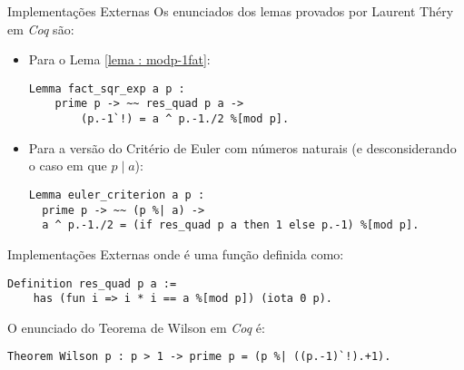 \begin{frame}[fragile]{Implementações Externas}
    Os enunciados dos lemas provados por Laurent Théry em \textit{Coq} são:
    \begin{itemize}
        \item Para o Lema \ref{lema : modp-1fat}:
            \begin{lstlisting}[language=coq,frame=single,tabsize=1]
Lemma fact_sqr_exp a p :
    prime p -> ~~ res_quad p a -> 
        (p.-1`!) = a ^ p.-1./2 %[mod p].              
            \end{lstlisting}
        \item Para a versão do Critério de Euler com números naturais (e desconsiderando o caso em que $p \mid a$):
            \begin{lstlisting}[language=coq,frame=single,tabsize=1]
Lemma euler_criterion a p : 
  prime p -> ~~ (p %| a) -> 
  a ^ p.-1./2 = (if res_quad p a then 1 else p.-1) %[mod p].
            \end{lstlisting}
    \end{itemize}
\end{frame}

\begin{frame}[fragile]{Implementações Externas}
onde  é uma função definida como:
    \begin{lstlisting}[language=coq,frame=single,tabsize=1]
Definition res_quad p a := 
    has (fun i => i * i == a %[mod p]) (iota 0 p).
    \end{lstlisting}

    O enunciado do Teorema de Wilson em \textit{Coq} é:
    \begin{lstlisting}[language=coq,frame=single,tabsize=1]
Theorem Wilson p : p > 1 -> prime p = (p %| ((p.-1)`!).+1).
    \end{lstlisting}
\end{frame}

